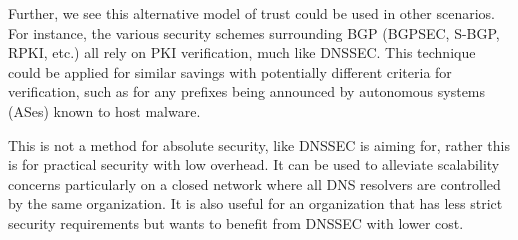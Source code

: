 Further, we see this alternative model of trust could be used in other 
scenarios. For instance, the various security schemes surrounding BGP (BGPSEC, 
S-BGP, RPKI, etc.) all rely on PKI verification, much like DNSSEC. This 
technique could be applied for similar savings with potentially different 
criteria for verification, such as for any prefixes being announced by 
autonomous systems (ASes) known to host malware. 

This is not a method for absolute security, like DNSSEC is aiming for, rather 
this is for practical security with low overhead. It can be used to alleviate
scalability concerns particularly on a closed network where all DNS resolvers are
controlled by the same organization. It is also useful for an organization that
has less strict security requirements but wants to benefit from DNSSEC with 
lower cost.


